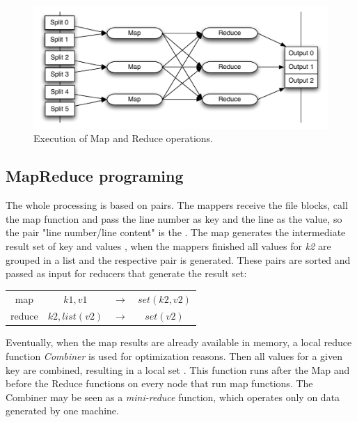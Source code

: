 \begin{figure}[htbp]
	\centering
	\includegraphics[width=\columnwidth]{img/mapreduce-en.pdf}
	\caption{Execution of Map and Reduce operations.}\label{fig:mrexecute}
\end{figure}

\subsection{MapReduce programing}

The whole processing is based on  pairs. The mappers receive the
file blocks, call the map function and pass the line number as key and
the line as the value, so the pair "line number/line content" is the .
The map generates the intermediate result set of key and values , 
when the mappers finished all values for \textit{k2} are grouped in a list and
the respective pair  is generated. These pairs are sorted and
passed as input for reducers that generate the result set:

\begin{center}
\begin{tabular}{c c c c}
	\hline
	   map & $k1,v1$ & $\rightarrow$  & $set(k2, v2)$ \\
	   reduce & $k2, list(v2)$ & $\rightarrow$ & $set(v2)$ \\
	\hline
\end{tabular}
\end{center}

Eventually, when the map results are already available in memory, a local reduce
function \emph{Combiner} is used for optimization reasons. Then all values for
a given key are combined, resulting in a local set .
This function runs after the Map and before the Reduce functions on
every node that run map functions. The Combiner may be seen as a \emph{mini-reduce}
function, which operates only on data generated by one machine.

